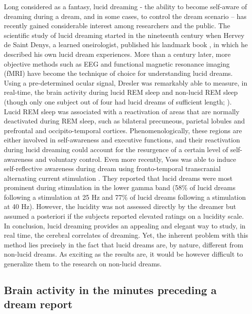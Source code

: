Long considered as a fantasy, lucid dreaming - the ability to become self-aware of dreaming during a dream, and in some cases, to control the dream scenario – has recently gained considerable interest among researchers and the public. The scientific study of lucid dreaming started in the nineteenth century when Hervey de Saint Denys, a learned oneirologist, published his landmark book , in which he described his own lucid dream experiences. More than a century later, more objective methods such as EEG and functional magnetic resonance imaging (fMRI) have become the technique of choice for understanding lucid dreams. Using a pre-determined ocular signal, Dresler was remarkably able to measure, in real-time, the brain activity during lucid REM sleep and non-lucid REM sleep (though only one subject out of four had lucid dreams of sufficient length; \citealp{dresler_neural_2012}). Lucid REM sleep was associated with a reactivation of areas that are normally deactivated during REM sleep, such as bilateral precuneous, parietal lobules and prefrontal and occipito-temporal cortices. Phenomenologically, these regions are either involved in self-awareness and executive functions, and their reactivation during lucid dreaming could account for the resurgence of a certain level of self-awareness and voluntary control. Even more recently, Voss was able to induce self-reflective awareness during dream using fronto-temporal transcranial alternating current stimulation \citep{voss_induction_2014}. They reported that lucid dreams were most prominent during stimulation in the lower gamma band (58\% of lucid dreams following a stimulation at 25 Hz and 77\% of lucid dreams following a stimulation at 40 Hz). However, the lucidity was not assessed directly by the dreamer but assumed a posteriori if the subjects reported elevated ratings on a lucidity scale. In conclusion, lucid dreaming provides an appealing and elegant way to study, in real time, the cerebral correlates of dreaming. Yet, the inherent problem with this method lies precisely in the fact that lucid dreams are, by nature, different from non-lucid dreams. As exciting as the results are, it would be however difficult to generalize them to the research on non-lucid dreams.

\subsection{Brain activity in the minutes preceding a dream report}
\label{sec:dream-research:attempts:ba-pre}

